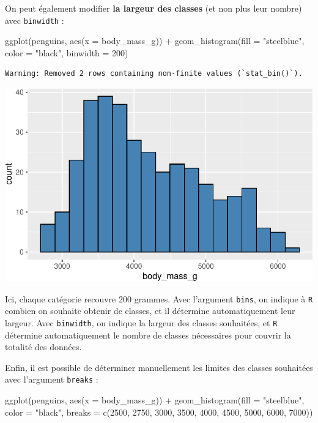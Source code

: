 \documentclass[
  a4paper,
  DIV=11,
  numbers=noendperiod,
  oneside]{scrreprt}
\newenvironment{Shaded}{}{}
\newcommand{\AttributeTok}[1]{\textcolor[rgb]{0.84,0.23,0.29}{#1}}
\newcommand{\DecValTok}[1]{\textcolor[rgb]{0.00,0.36,0.77}{#1}}
\newcommand{\FunctionTok}[1]{\textcolor[rgb]{0.44,0.26,0.76}{#1}}
\newcommand{\NormalTok}[1]{\textcolor[rgb]{0.14,0.16,0.18}{#1}}
\newcommand{\SpecialCharTok}[1]{\textcolor[rgb]{0.00,0.36,0.77}{#1}}
\newcommand{\StringTok}[1]{\textcolor[rgb]{0.01,0.18,0.38}{#1}}
\begin{document}
On peut également modifier \textbf{la largeur des classes} (et non plus
leur nombre) avec \texttt{binwidth} :

\begin{Shaded}
\begin{Highlighting}[]
\FunctionTok{ggplot}\NormalTok{(penguins, }\FunctionTok{aes}\NormalTok{(}\AttributeTok{x =}\NormalTok{ body\_mass\_g)) }\SpecialCharTok{+}
  \FunctionTok{geom\_histogram}\NormalTok{(}\AttributeTok{fill =} \StringTok{"steelblue"}\NormalTok{, }\AttributeTok{color =} \StringTok{"black"}\NormalTok{,}
                 \AttributeTok{binwidth =} \DecValTok{200}\NormalTok{)}
\end{Highlighting}
\end{Shaded}

\begin{verbatim}
Warning: Removed 2 rows containing non-finite values (`stat_bin()`).
\end{verbatim}

\includegraphics{03-visualization_files/figure-pdf/unnamed-chunk-16-1.pdf}

Ici, chaque catégorie recouvre 200 grammes. Avec l'argument
\texttt{bins}, on indique à \texttt{R} combien on souhaite obtenir de
classes, et il détermine automatiquement leur largeur. Avec
\texttt{binwidth}, on indique la largeur des classes souhaitées, et
\texttt{R} détermine automatiquement le nombre de classes nécessaires
pour couvrir la totalité des données.

Enfin, il est possible de déterminer manuellement les limites des
classes souhaitées avec l'argument \texttt{breaks} :

\begin{Shaded}
\begin{Highlighting}[]
\FunctionTok{ggplot}\NormalTok{(penguins, }\FunctionTok{aes}\NormalTok{(}\AttributeTok{x =}\NormalTok{ body\_mass\_g)) }\SpecialCharTok{+}
  \FunctionTok{geom\_histogram}\NormalTok{(}\AttributeTok{fill =} \StringTok{"steelblue"}\NormalTok{, }\AttributeTok{color =} \StringTok{"black"}\NormalTok{,}
                 \AttributeTok{breaks =} \FunctionTok{c}\NormalTok{(}\DecValTok{2500}\NormalTok{, }\DecValTok{2750}\NormalTok{, }\DecValTok{3000}\NormalTok{, }\DecValTok{3500}\NormalTok{, }\DecValTok{4000}\NormalTok{, }\DecValTok{4500}\NormalTok{, }\DecValTok{5000}\NormalTok{, }\DecValTok{6000}\NormalTok{, }\DecValTok{7000}\NormalTok{))}
\end{Highlighting}
\end{Shaded}
\end{document}
